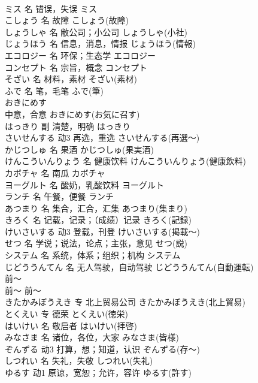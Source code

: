 \documentclass[8pt]{extreport}
\begin{document}
\begin{CJK}{UTF8}{min}
\\	ミス	名	错误，失误	ミス	
\\	こしょう	名	故障	こしょう(故障)	
\\	しょうしゃ	名	敝公司；小公司	しょうしゃ(小社)	
\\	じょうほう	名	信息，消息，情报	じょうほう(情報)	
\\	エコロジー	名	环保；生态学	エコロジー	
\\	コンセプト	名	宗旨，概念	コンセプト	
\\	そざい	名	材料，素材	そざい(素材)	
\\	ふで	名	笔，毛笔	ふで(筆)	
\\	おきにめす	
\\	中意，合意	おきにめす(お気に召す)	
\\	はっきり	副	清楚，明确	はっきり	
\\	さいせんする	动3	再选，重选	さいせんする(再選～)	
\\	かじつしゅ	名	果酒	かじつしゅ(果実酒)	
\\	けんこういんりょう	名	健康饮料	けんこういんりょう(健康飲料)	
\\	カボチャ	名	南瓜	カボチャ	
\\	ヨーグルト	名	酸奶，乳酸饮料	ヨーグルト	
\\	ランチ	名	午餐，便餐	ランチ	
\\	あつまり	名	集合，汇合，汇集	あつまり(集まり)	
\\	きろく	名	记载，记录；（成绩）记录	きろく(記録)	
\\	けいさいする	动3	登载，刊登	けいさいする(掲載～)	
\\	せつ	名	学说；说法，论点；主张，意见	せつ(説)	
\\	システム	名	系统，体系；组织；机构	システム	
\\	じどううんてん	名	无人驾驶，自动驾驶	じどううんてん(自動運転)	
\\	前～	
\\	前～	前～	
\\	きたかみぼうえき	专	北上贸易公司	きたかみぼうえき(北上貿易)	
\\	とくえい	专	德荣	とくえい(徳栄)	
\\	はいけい	名	敬启者	はいけい(拝啓)	
\\	みなさま	名	诸位，各位，大家	みなさま(皆様)	
\\	ぞんずる	动3	打算，想；知道，认识	ぞんずる(存～)	
\\	しつれい	名	失礼，失敬	しつれい(失礼)	
\\	ゆるす	动1	原谅，宽恕；允许，容许	ゆるす(許す)	

\end{CJK}
\end{document}

